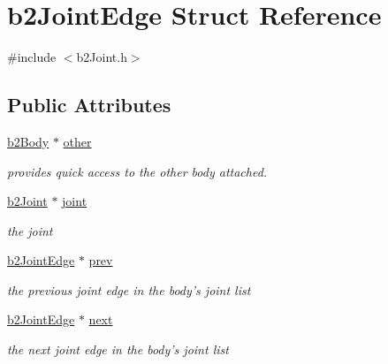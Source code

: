 \hypertarget{structb2_joint_edge}{\section{b2\-Joint\-Edge Struct Reference}
\label{structb2_joint_edge}
}


{\ttfamily \#include $<$b2\-Joint.\-h$>$}

\subsection*{Public Attributes}
\begin{DoxyCompactItemize}
\item 
\hypertarget{structb2_joint_edge_a64aef21fb91211871de8796baecccb95}{\hyperlink{classb2_body}{b2\-Body} $\ast$ \hyperlink{structb2_joint_edge_a64aef21fb91211871de8796baecccb95}{other}}\label{structb2_joint_edge_a64aef21fb91211871de8796baecccb95}

\begin{DoxyCompactList}\small\item\em provides quick access to the other body attached. \end{DoxyCompactList}\item 
\hypertarget{structb2_joint_edge_ab5bac5d495af1280c50271f56a221503}{\hyperlink{classb2_joint}{b2\-Joint} $\ast$ \hyperlink{structb2_joint_edge_ab5bac5d495af1280c50271f56a221503}{joint}}\label{structb2_joint_edge_ab5bac5d495af1280c50271f56a221503}

\begin{DoxyCompactList}\small\item\em the joint \end{DoxyCompactList}\item 
\hypertarget{structb2_joint_edge_acc3621e38d9664db2805e0fc29d71335}{\hyperlink{structb2_joint_edge}{b2\-Joint\-Edge} $\ast$ \hyperlink{structb2_joint_edge_acc3621e38d9664db2805e0fc29d71335}{prev}}\label{structb2_joint_edge_acc3621e38d9664db2805e0fc29d71335}

\begin{DoxyCompactList}\small\item\em the previous joint edge in the body's joint list \end{DoxyCompactList}\item 
\hypertarget{structb2_joint_edge_a3d17286bc697bb620ee151e4cd07438c}{\hyperlink{structb2_joint_edge}{b2\-Joint\-Edge} $\ast$ \hyperlink{structb2_joint_edge_a3d17286bc697bb620ee151e4cd07438c}{next}}\label{structb2_joint_edge_a3d17286bc697bb620ee151e4cd07438c}

\begin{DoxyCompactList}\small\item\em the next joint edge in the body's joint list \end{DoxyCompactList}\end{DoxyCompactItemize}


